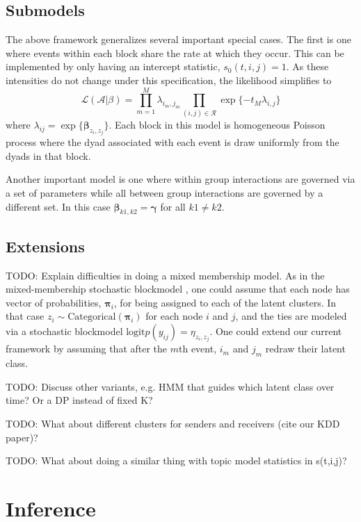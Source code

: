 \documentclass[11pt]{article}
\begin{document}
\subsection{Submodels}

The above framework generalizes several important special cases.  The first is one where events within each block share the rate at which they occur.  This can be implemented by only having an intercept statistic, $s_0(t,i,j) = 1$.  As these intensities do not change under this specification, the likelihood simplifies to 
$$\mathcal{L}(\mathcal{A}|\beta) = \prod_{m=1}^M \lambda_{i_m,j_m} \prod_{(i,j) \in \mathcal{R}} \exp\{-t_M \lambda_{i,j}\}$$
where $ \lambda_{ij} = \exp\{\boldsymbol{\beta}_{z_i,z_j}\}$.  Each block in this model is homogeneous Poisson process where the dyad associated with each event is draw uniformly from the dyads in that block.

Another important model is one where within group interactions are governed via a set of parameters while all between group interactions are governed by a different set.  In this case $\boldsymbol{\beta}_{k1,k2} = \boldsymbol{\gamma}$ for all $k1 \ne k2$. 

\subsection{Extensions}
TODO: Explain difficulties in doing a mixed membership model.  As in the mixed-membership stochastic blockmodel \cite{Airoldi2008,Shafiei2010}, one could assume that each node has vector of probabilities, $\boldsymbol{\pi}_i$, for being assigned to each of the latent clusters.  In that case $z_i \sim \mbox{Categorical}(\boldsymbol{\pi}_i)$ for each node $i$ and $j$, and the ties are modeled via a stochastic blockmodel $\mbox{logit} p(y_{ij}) = \eta_{z_i,z_j}$.  One could extend our current framework by assuming that after the $m$th event, $i_m$ and $j_m$ redraw their latent class.

TODO: Discuss other variants, e.g. HMM that guides which latent class over time?  Or a DP instead of fixed K?

TODO: What about different clusters for senders and receivers (cite our KDD paper)?

TODO: What about doing a similar thing with topic model statistics in s(t,i,j)?

\section{Inference}
\end{document}
